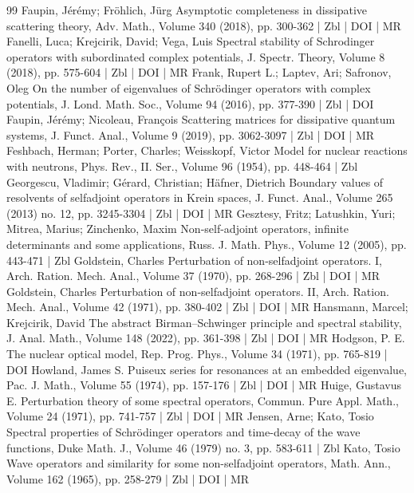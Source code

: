 \begin{thebibliography}{99}
Faupin, Jérémy; Fröhlich, Jürg Asymptotic completeness in dissipative scattering theory, Adv. Math., Volume 340 (2018), pp. 300-362 | Zbl | DOI | MR
Fanelli, Luca; Krejcirik, David; Vega, Luis Spectral stability of Schrodinger operators with subordinated complex potentials, J. Spectr. Theory, Volume 8 (2018), pp. 575-604 | Zbl | DOI | MR
Frank, Rupert L.; Laptev, Ari; Safronov, Oleg On the number of eigenvalues of Schrödinger operators with complex potentials, J. Lond. Math. Soc., Volume 94 (2016), pp. 377-390 | Zbl | DOI
Faupin, Jérémy; Nicoleau, François Scattering matrices for dissipative quantum systems, J. Funct. Anal., Volume 9 (2019), pp. 3062-3097 | Zbl | DOI | MR
Feshbach, Herman; Porter, Charles; Weisskopf, Victor Model for nuclear reactions with neutrons, Phys. Rev., II. Ser., Volume 96 (1954), pp. 448-464 | Zbl
Georgescu, Vladimir; Gérard, Christian; Häfner, Dietrich Boundary values of resolvents of selfadjoint operators in Krein spaces, J. Funct. Anal., Volume 265 (2013) no. 12, pp. 3245-3304 | Zbl | DOI | MR
Gesztesy, Fritz; Latushkin, Yuri; Mitrea, Marius; Zinchenko, Maxim Non-self-adjoint operators, infinite determinants and some applications, Russ. J. Math. Phys., Volume 12 (2005), pp. 443-471 | Zbl
Goldstein, Charles Perturbation of non-selfadjoint operators. I, Arch. Ration. Mech. Anal., Volume 37 (1970), pp. 268-296 | Zbl | DOI | MR
Goldstein, Charles Perturbation of non-selfadjoint operators. II, Arch. Ration. Mech. Anal., Volume 42 (1971), pp. 380-402 | Zbl | DOI | MR
Hansmann, Marcel; Krejcirik, David The abstract Birman–Schwinger principle and spectral stability, J. Anal. Math., Volume 148 (2022), pp. 361-398 | Zbl | DOI | MR
Hodgson, P. E. The nuclear optical model, Rep. Prog. Phys., Volume 34 (1971), pp. 765-819 | DOI
Howland, James S. Puiseux series for resonances at an embedded eigenvalue, Pac. J. Math., Volume 55 (1974), pp. 157-176 | Zbl | DOI | MR
Huige, Gustavus E. Perturbation theory of some spectral operators, Commun. Pure Appl. Math., Volume 24 (1971), pp. 741-757 | Zbl | DOI | MR
Jensen, Arne; Kato, Tosio Spectral properties of Schrödinger operators and time-decay of the wave functions, Duke Math. J., Volume 46 (1979) no. 3, pp. 583-611 | Zbl
Kato, Tosio Wave operators and similarity for some non-selfadjoint operators, Math. Ann., Volume 162 (1965), pp. 258-279 | Zbl | DOI | MR

\end{thebibliography}
